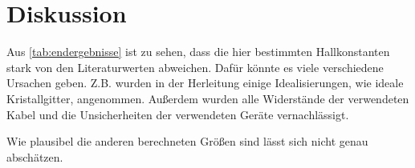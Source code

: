 \section{Diskussion}
\label{sec:Diskussion}


Aus \autoref{tab:endergebnisse} ist zu sehen, dass die hier bestimmten Hallkonstanten stark von den Literaturwerten abweichen.
Dafür könnte es viele verschiedene Ursachen geben. 
Z.B. wurden in der Herleitung einige Idealisierungen, wie ideale Kristallgitter, angenommen.
Außerdem wurden alle Widerstände der verwendeten Kabel und die Unsicherheiten der verwendeten Geräte vernachlässigt.

Wie plausibel die anderen berechneten Größen sind lässt sich nicht genau abschätzen.